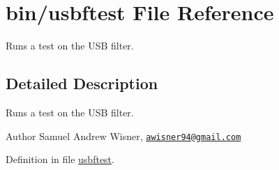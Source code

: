 \hypertarget{usbftest}{\section{bin/usbftest File Reference}
\label{usbftest}
}


Runs a test on the U\+S\+B filter.  




\subsection{Detailed Description}
Runs a test on the U\+S\+B filter. 

\begin{DoxyAuthor}{Author}
Samuel Andrew Wisner, \href{mailto:awisner94@gmail.com}{\tt awisner94@gmail.\+com} 
\end{DoxyAuthor}


Definition in file \hyperlink{usbftest_source}{usbftest}.


